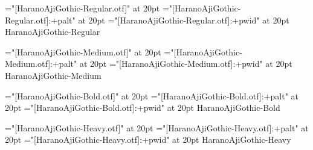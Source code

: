 \test
\vfil
\eject

\font\fnone="[HaranoAjiGothic-Regular.otf]" at 20pt
\font\fpalt="[HaranoAjiGothic-Regular.otf]:+palt" at 20pt
\font\fpwid="[HaranoAjiGothic-Regular.otf]:+pwid" at 20pt
\fnone HaranoAjiGothic-Regular

\test
\vfil
\eject

\font\fnone="[HaranoAjiGothic-Medium.otf]" at 20pt
\font\fpalt="[HaranoAjiGothic-Medium.otf]:+palt" at 20pt
\font\fpwid="[HaranoAjiGothic-Medium.otf]:+pwid" at 20pt
\fnone HaranoAjiGothic-Medium

\test
\vfil
\eject

\font\fnone="[HaranoAjiGothic-Bold.otf]" at 20pt
\font\fpalt="[HaranoAjiGothic-Bold.otf]:+palt" at 20pt
\font\fpwid="[HaranoAjiGothic-Bold.otf]:+pwid" at 20pt
\fnone HaranoAjiGothic-Bold

\test
\vfil
\eject

\font\fnone="[HaranoAjiGothic-Heavy.otf]" at 20pt
\font\fpalt="[HaranoAjiGothic-Heavy.otf]:+palt" at 20pt
\font\fpwid="[HaranoAjiGothic-Heavy.otf]:+pwid" at 20pt
\fnone HaranoAjiGothic-Heavy

\test
\vfil
\eject

\bye
